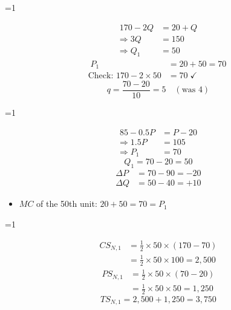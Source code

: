 \documentclass{beamer}
\newcommand{\showanswers}{0}
\begin{document}
\ifnum\showanswers=1
\begin{frame}[plain,label=w2_ans_q21a]
  \Large
  \begin{align*}
    \tag{M11}\;170 - 2Q &= 20 + Q\\
    \Rightarrow 3Q &= 150\\
    \Rightarrow Q_1 &= 50
  \end{align*}
  \begin{align*}
    \tag{M12}\;P_1 &= 20 + 50 = 70\\
    \text{Check: } 170 - 2 \times 50 &= 70 \;\checkmark
  \end{align*}
  \[
    \tag{M13}\;q = \frac{70 - 20}{10} = 5 \quad (\text{was } 4)
  \]
\end{frame}
\fi

\ifnum\showanswers=1
\begin{frame}[plain,label=w2_ans_q21b]
  \Large
  \begin{align*}
    \tag{M14}\;85 - 0.5P &= P - 20\\
    \Rightarrow 1.5P &= 105\\
    \Rightarrow P_1 &= 70
  \end{align*}
  \[
    \tag{M15}\;Q_1 = 70 - 20 = 50
  \]
  \begin{align*}
    \tag{M16}\;\Delta P &= 70 - 90 = -20\\
    \tag{M17}\;\Delta Q &= 50 - 40 = +10
  \end{align*}
  \begin{itemize}\Large
    \item $MC$ of the 50th unit: $20 + 50 = 70 = P_1$
  \end{itemize}
\end{frame}
\fi

\ifnum\showanswers=1
\begin{frame}[plain,label=w2_ans_q22a]
  \Large
  \begin{align*}
    \tag{M18}\;CS_{N,1} &= \tfrac{1}{2} \times 50 \times (170 - 70)\\
                       &= \tfrac{1}{2} \times 50 \times 100 = 2{,}500
  \end{align*}
  \begin{align*}
    \tag{M19}\;PS_{N,1} &= \tfrac{1}{2} \times 50 \times (70 - 20)\\
                       &= \tfrac{1}{2} \times 50 \times 50 = 1{,}250
  \end{align*}
  \[
    \tag{M20}\;TS_{N,1} = 2{,}500 + 1{,}250 = 3{,}750
  \]
\end{frame}
\fi
\end{document}
